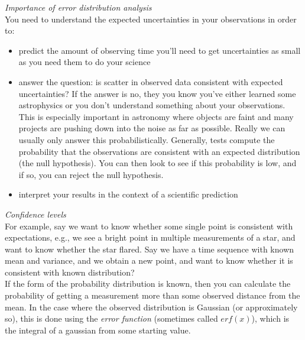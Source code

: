 \documentclass[12pt]{article}
\begin{document}
\noindent \emph{Importance of error distribution analysis}\\

\noindent You need to understand the expected uncertainties in your
observations in order to:
\begin{itemize}
    \item predict the amount of observing time you'll need to get
    uncertainties as small as you need them to do your science
    \item answer the question: is scatter in observed data consistent
    with expected uncertainties? If the answer is no, they you know
    you've either learned some astrophysics or you don't understand
    something about your observations. This is especially important in
    astronomy where objects are faint and many projects are pushing
    down into the noise as far as possible. Really we can usually only
    answer this probabilistically. Generally, tests compute the
    probability that the observations are consistent with an expected
    distribution (the null hypothesis). You can then look to see if
    this probability is low, and if so, you can reject the null
    hypothesis.
    \item interpret your results in the context of a scientific
    prediction
\end{itemize}
\emph{Confidence levels}\\

\noindent For example, say we want to know whether some single point
is consistent with expectations, e.g., we see a bright point in
multiple measurements of a star, and want to know whether the star
flared. Say we have a time sequence with known mean and variance, and
we obtain a new point, and want to know whether it is consistent with
known distribution?\\

\noindent If the form of the probability distribution is known, then
you can calculate the probability of getting a measurement more than
some observed distance from the mean. In the case where the observed
distribution is Gaussian (or approximately so), this is done using the
\emph{error function} (sometimes called $erf(x)$), which is the integral of a
gaussian from some starting value.\\
\end{document}
